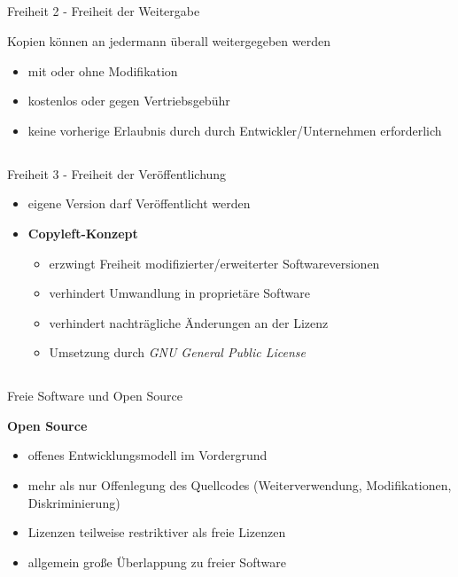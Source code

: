 \documentclass[12pt]{beamer}
\begin{document}
\subsection{}
\begin{frame}{Freiheit 2 - Freiheit der Weitergabe}


Kopien können an jedermann überall weitergegeben werden
\begin{itemize}
\item mit oder ohne Modifikation
\item kostenlos oder gegen Vertriebsgebühr
\item keine vorherige Erlaubnis durch durch Entwickler/Unternehmen erforderlich
\end{itemize}
\end{frame}



\subsection{}
\begin{frame}{Freiheit 3 - Freiheit der Veröffentlichung}

\begin{itemize}
\item eigene Version darf Veröffentlicht werden
\item \textbf{Copyleft-Konzept}

\begin{itemize}
\item erzwingt Freiheit modifizierter/erweiterter Softwareversionen
\item verhindert Umwandlung in proprietäre Software
\item verhindert nachträgliche Änderungen an der Lizenz
\item Umsetzung durch \emph{GNU General Public License}
\end{itemize}
\end{itemize}
\end{frame}



\subsection{}
\begin{frame}{Freie Software und Open Source}


\textbf{Open Source}
\begin{itemize}
\item offenes Entwicklungsmodell im Vordergrund
\item mehr als nur Offenlegung des Quellcodes (Weiterverwendung, Modifikationen,
Diskriminierung)
\item Lizenzen teilweise restriktiver als freie Lizenzen
\item allgemein große Überlappung zu freier Software
\end{itemize}
\end{frame}
\end{document}
